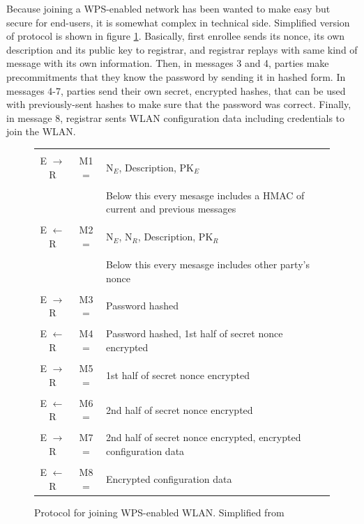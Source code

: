 \documentclass[12pt,a4paper,oneside,pdftex]{report}
\begin{document}
Because joining a WPS-enabled network has been wanted to make easy but secure for end-users, it is somewhat complex in technical side. Simplified version of protocol is shown in figure \ref{tab:wps}. Basically, first enrollee sends its nonce, its own description and its public key to registrar, and registrar replays with same kind of message with its own information. Then, in messages 3 and 4, parties make precommitments that they know the password by sending it in hashed form. In messages 4-7, parties send their own secret, encrypted hashes, that can be used with previously-sent hashes to make sure that the password was correct. Finally, in message 8, registrar sents WLAN configuration data including credentials to join the WLAN.

\begin{figure}
\label{tab:wps}
\begin{tabular}{c|c p{10cm}}
    \hline \\

    E $\rightarrow$ R & M1 = & N$_E$, Description, PK$_E$ \\\\

    &  & Below this every mesasge includes a HMAC of current and previous messages \\
    \hline \\

    E $\leftarrow$ R & M2 = & N$_E$, N$_R$, Description, PK$_R$ \\\\

    &  & Below this every mesasge includes other party's nonce \\
    \hline \\

    E $\rightarrow$ R & M3 = & Password hashed \\\\

    E $\leftarrow$ R & M4 = & Password hashed, 1st half of secret nonce encrypted \\\\

    E $\rightarrow$ R & M5 = & 1st half of secret nonce encrypted \\\\

    E $\leftarrow$ R & M6 = & 2nd half of secret nonce encrypted \\\\

    E $\rightarrow$ R & M7 = & 2nd half of secret nonce encrypted, encrypted configuration data \\\\

    E $\leftarrow$ R & M8 = & Encrypted configuration data \\
    \hline
\end{tabular}
\caption{Protocol for joining WPS-enabled WLAN. Simplified from \cite{microsoftWCN}}
\end{figure}
\end{document}
